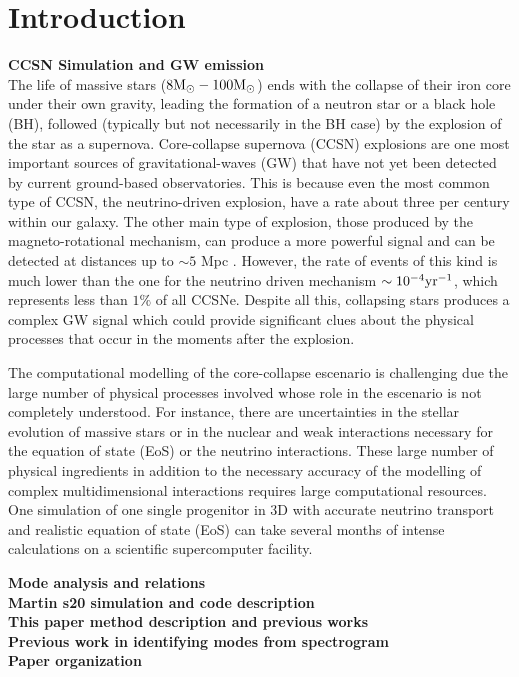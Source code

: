 \section{Introduction}


\textbf{CCSN Simulation and GW emission}\\
The life of massive stars ($8 {\rm M}_\odot-100{\rm M}_\odot$) ends with the collapse of their iron core under their own gravity, leading the formation of a neutron star or a black hole (BH), followed (typically but not necessarily in the BH case)  by the explosion of the star as a supernova. Core-collapse supernova (CCSN) explosions are one most important sources of gravitational-waves (GW) that have not yet been detected by current ground-based observatories. This is because even the most common type of CCSN, the neutrino-driven explosion, have a rate about three per century \cite{Gossan:2016} within our galaxy. The other main type of explosion, those produced by the magneto-rotational mechanism, can produce a more powerful signal and can be detected at distances up to $\sim 5$ Mpc \cite{Gossan:2016}. However, the rate of events of this kind is much lower than the one for the neutrino driven mechanism $\sim 10^{-4} \rm{yr}^{-1}$, which represents less than $1 \%$ of all CCSNe.
Despite all this, collapsing stars produces a complex GW signal which could provide significant clues about the physical processes that occur in the moments after the explosion. 

The computational modelling of the core-collapse escenario is challenging due the large number of physical processes involved whose role in the escenario is not completely understood. For instance, there are uncertainties in the stellar evolution of massive stars or in the nuclear and weak interactions necessary for the equation of state (EoS) or the neutrino interactions.  These large number of physical ingredients in addition to the necessary accuracy of the modelling of complex multidimensional interactions requires large computational resources. One simulation of one single progenitor in 3D with accurate neutrino transport and realistic equation of state (EoS) can take several months of intense calculations on a scientific supercomputer facility.


\textbf{Mode analysis and relations}\\
\textbf{Martin s20 simulation and code description}\\
\textbf{This paper method description and previous works}\\
\textbf{Previous work in identifying modes from spectrogram}\\
\textbf{Paper organization}\\
